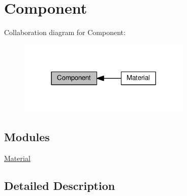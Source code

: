 \hypertarget{group___component}{}\section{Component}
\label{group___component}
Collaboration diagram for Component\+:\nopagebreak
\begin{figure}[H]
\begin{center}
\leavevmode
\includegraphics[width=234pt]{group___component}
\end{center}
\end{figure}
\subsection*{Modules}
\begin{DoxyCompactItemize}
\item 
\hyperlink{group___material}{Material}
\end{DoxyCompactItemize}


\subsection{Detailed Description}
